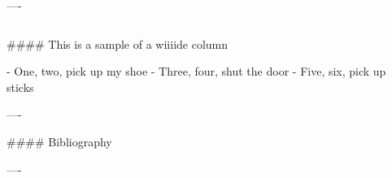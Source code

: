 \documentclass{beamer}
\begin{document}
\begin{frame}[fragile]
\begin{columns}[T]
\begin{column}{.46\textwidth}
\begin{markdown}
----

\end{markdown}
\end{column}
\end{columns}

\begin{markdown}

#### This is a sample of a wiiiide column

- One, two, pick up my shoe
- Three, four, shut the door
- Five, six, pick up sticks

----

#### Bibliography




----

\end{markdown}

\end{frame}
\end{document}
